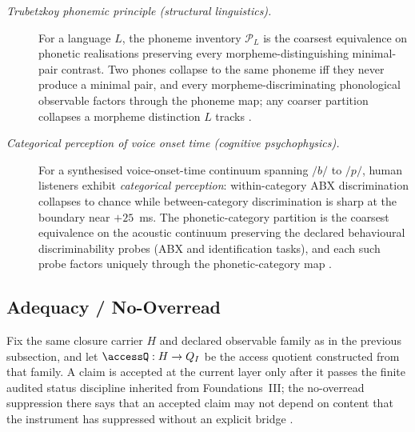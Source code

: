 \documentclass[11pt]{article}
\newcommand{\FoundIII}{Foundations~III}
\theoremstyle{definition}
\begin{document}
\begin{description}
\item[\emph{Trubetzkoy phonemic principle (structural linguistics).}]
For a language \(L\), the phoneme inventory \(\mathcal P_L\) is the
coarsest equivalence on phonetic realisations preserving every
morpheme-distinguishing minimal-pair contrast.  Two phones collapse
to the same phoneme iff they never produce a minimal pair, and
every morpheme-discriminating phonological observable factors
through the phoneme map; any coarser partition collapses a
morpheme distinction \(L\) tracks
\citep{Trubetzkoy1939GrundzugePhonologie}.

\item[\emph{Categorical perception of voice onset time (cognitive
psychophysics).}]
For a synthesised voice-onset-time continuum spanning \(/{\!b}/\) to
\(/{\!p}/\), human listeners exhibit \emph{categorical perception}:
within-category {ABX} discrimination collapses to chance while
between-category discrimination is sharp at the boundary near
\(+25\)~ms.  The phonetic-category partition is the coarsest
equivalence on the acoustic continuum preserving the declared
behavioural discriminability probes (ABX and identification
tasks), and each such probe factors uniquely through the
phonetic-category map
\citep{LibermanHarrisHoffmanGriffith1957Discrimination}.
\end{description}

\subsection{Adequacy / No-Overread}\label{sec:access:adequacy}

Fix the same closure carrier \(H\) and declared observable family as
in the previous subsection, and let \(\accessQ:H\to Q_I\) be the
access quotient constructed from that family.  A claim is accepted at
the current layer only after it passes the finite audited status
discipline inherited from \FoundIII; the no-overread suppression
there says that an accepted claim may not depend on content that the
instrument has suppressed without an explicit bridge
\citep{Tsiokos2026FoundationsIII}.
\end{document}
